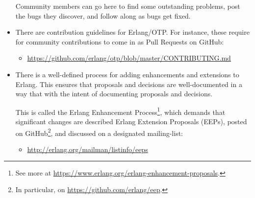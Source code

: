 \begin{itemize}
\begin{itemize}
\end{itemize}

Community members can go here to find some outstanding problems, post
the bugs they discover, and follow along as bugs get fixed.

\item There are contribution guidelines for Erlang/OTP. For instance,
these require for community contributions to come in as Pull Requests
on GitHub:

\begin{itemize}

\item \url{https://github.com/erlang/otp/blob/master/CONTRIBUTING.md}

\end{itemize}

\item There is a well-defined process for adding enhancements and
extensions to Erlang. This ensures that proposals and decisions are
well-documented in a way that with the intent of documenting proposals
and decisions.

This is called the Erlang Enhancement Process\footnote{See more at
\url{https://www.erlang.org/erlang-enhancement-proposals}.}, which
demands that significant changes are described Erlang Extension
Proposals (EEPs), posted on GitHub\footnote{In particular, on
\url{https://github.com/erlang/eep}.}, and discussed on a designated
mailing-list:

\begin{itemize}

\item \url{http://erlang.org/mailman/listinfo/eeps}

\end{itemize}

\end{itemize}
